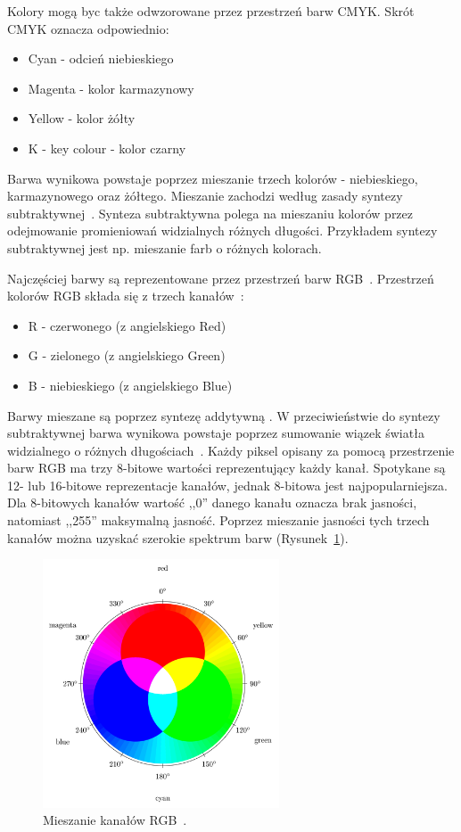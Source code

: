 \documentclass[a4paper,twoside,12pt]{book}
\begin{document}
    Kolory mogą byc także odwzorowane przez przestrzeń barw CMYK.
    Skrót CMYK oznacza odpowiednio:
    \begin{itemize}
        \item Cyan - odcień niebieskiego
        \item Magenta - kolor karmazynowy
        \item Yellow - kolor żółty
        \item K - key colour - kolor czarny
    \end{itemize}
    Barwa wynikowa powstaje poprzez mieszanie trzech kolorów - niebieskiego, karmazynowego oraz żółtego.
    Mieszanie zachodzi według zasady syntezy subtraktywnej~\cite{przestrzenieKolorow}.
    Synteza subtraktywna polega na mieszaniu kolorów przez odejmowanie promieniowań widzialnych różnych długości.
    Przykładem syntezy subtraktywnej jest np. mieszanie farb o różnych kolorach.

    Najczęściej barwy są reprezentowane przez przestrzeń barw RGB~\cite{przestrzenieKolorow}.
    Przestrzeń kolorów RGB składa się z trzech kanałów~\cite{kolory}:

    \begin{itemize}
        \item R - czerwonego (z angielskiego Red)
        \item G - zielonego (z angielskiego Green)
        \item B - niebieskiego (z angielskiego Blue)
    \end{itemize}
    Barwy mieszane są poprzez syntezę addytywną .
    W przeciwieństwie do syntezy subtraktywnej barwa wynikowa powstaje poprzez sumowanie wiązek światła widzialnego o
    różnych długościach~\cite{przestrzenieKolorow}.
    Każdy piksel opisany za pomocą przestrzenie barw RGB ma trzy 8-bitowe wartości reprezentujący każdy kanał.
    Spotykane
    są 12- lub 16-bitowe reprezentacje kanałów, jednak 8-bitowa jest najpopularniejsza.
    Dla 8-bitowych kanałów
    wartość ,,0''
    danego kanału oznacza brak jasności, natomiast ,,255'' maksymalną jasność.
    Poprzez mieszanie jasności tych trzech kanałów
    można uzyskać szerokie spektrum barw (Rysunek~\ref{fig.mieszanieKolorow}).

    \begin{figure}
        \centering
        \includegraphics[width=7cm]{Obrazy/mieszanieKolorow.jpg}
        \caption{Mieszanie kanałów RGB~\cite{colorMixing}.}
        \label{fig.mieszanieKolorow}
    \end{figure}
\end{document}
